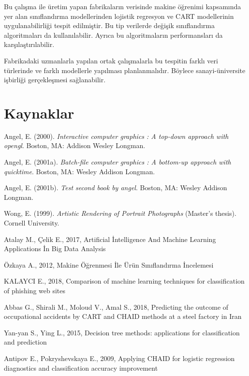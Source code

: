 \documentclass[12pt,twoside]{deuthesis}
\newlength{\cslhangindent}
\newenvironment{cslreferences}%

{\setlength{\parindent}{0pt}%

            \everypar{\setlength{\hangindent}{\cslhangindent}}\ignorespaces}%

{\par}
\begin{document}
Bu çalışma ile üretim yapan fabrikaların verisinde makine öğrenimi kapsamında yer alan sınıflandırma modellerinden lojistik regresyon ve CART modellerinin uygulanabilirliği tespit edilmiştir. Bu tip verilerde değişik sınıflandırma algoritmaları da kullanılabilir. Ayrıca bu algoritmaların performansları da karşılaştırılabilir.

Fabrikadaki uzmanlarla yapılan ortak çalışmalarla bu tespitin farklı veri türlerinde ve
farklı modellerle yapılması planlanmalıdır. Böylece sanayi-üniversite işbirliği
gerçekleşmesi sağlanabilir.

\backmatter

\hypertarget{kaynaklar}{%
\chapter*{Kaynaklar}\label{kaynaklar}}


\hypertarget{refs}{}
\begin{cslreferences}
\leavevmode\hypertarget{ref-angel2000}{}%
Angel, E. (2000). \emph{Interactive computer graphics : A top-down approach with opengl}. Boston, MA: Addison Wesley Longman.

\leavevmode\hypertarget{ref-angel2001a}{}%
Angel, E. (2001a). \emph{Batch-file computer graphics : A bottom-up approach with quicktime}. Boston, MA: Wesley Addison Longman.

\leavevmode\hypertarget{ref-angel2001b}{}%
Angel, E. (2001b). \emph{Test second book by angel}. Boston, MA: Wesley Addison Longman.

\leavevmode\hypertarget{ref-wong1999}{}%
Wong, E. (1999). \emph{Artistic Rendering of Portrait Photographs} (Master's thesis). Cornell University.
\end{cslreferences}
\setlength{\parindent}{-0.20in}
\setlength{\leftskip}{0.20in}
\setlength{\parskip}{8pt}

Atalay M., Çelik E., 2017, Artificial İntelligence And Machine Learning Applications İn Big Data Analysis

Özkaya A., 2012, Makine Öğrenmesi İle Ürün Sınıflandırma İncelemesi

KALAYCI E., 2018, Comparison of machine learning techniques for classification of phishing web sites

Abbas G., Shirali M., Moloud V., Amal S., 2018, Predicting the outcome of occupational accidents by CART and CHAID methods at a steel factory in Iran

Yan-yan S., Ying L., 2015, Decision tree methods: applications for classification and prediction

Antipov E., Pokryshevskaya E., 2009, Applying CHAID for logistic regression diagnostics and classification accuracy improvement

\appendix
\end{document}
